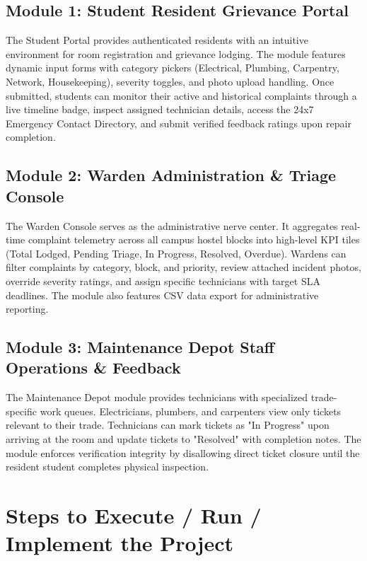 \documentclass[10pt]{report}
\begin{document}
\subsection{Module 1: Student Resident Grievance Portal}
\hspace{0.5cm}The Student Portal provides authenticated residents with an intuitive environment for room registration and grievance lodging. The module features dynamic input forms with category pickers (Electrical, Plumbing, Carpentry, Network, Housekeeping), severity toggles, and photo upload handling. Once submitted, students can monitor their active and historical complaints through a live timeline badge, inspect assigned technician details, access the 24x7 Emergency Contact Directory, and submit verified feedback ratings upon repair completion.

\subsection{Module 2: Warden Administration \& Triage Console}
\hspace{0.5cm}The Warden Console serves as the administrative nerve center. It aggregates real-time complaint telemetry across all campus hostel blocks into high-level KPI tiles (Total Lodged, Pending Triage, In Progress, Resolved, Overdue). Wardens can filter complaints by category, block, and priority, review attached incident photos, override severity ratings, and assign specific technicians with target SLA deadlines. The module also features CSV data export for administrative reporting.

\subsection{Module 3: Maintenance Depot Staff Operations \& Feedback}
\hspace{0.5cm}The Maintenance Depot module provides technicians with specialized trade-specific work queues. Electricians, plumbers, and carpenters view only tickets relevant to their trade. Technicians can mark tickets as "In Progress" upon arriving at the room and update tickets to "Resolved" with completion notes. The module enforces verification integrity by disallowing direct ticket closure until the resident student completes physical inspection.

\section{Steps to Execute / Run / Implement the Project}
\end{document}
